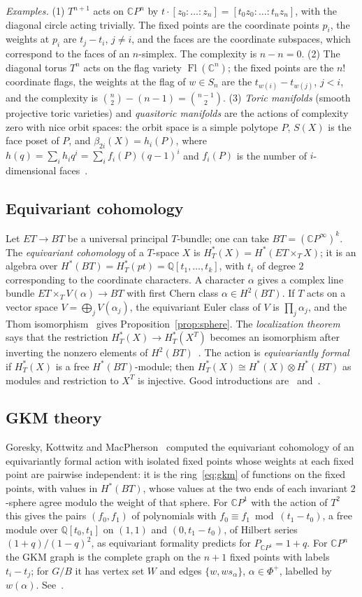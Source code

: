 \documentclass[11pt,a4paper]{article}
\numberwithin{equation}{section}
\theoremstyle{plain}
\theoremstyle{definition}
\theoremstyle{remark}
\newcommand{\Q}{\mathbb{Q}}
\newcommand{\C}{\mathbb{C}}
\newcommand{\HT}{H^{*}_{T}}
\DeclareMathOperator{\Fl}{Fl}
\begin{document}
\emph{Examples.} (1) $T^{n+1}$ acts on $\C P^n$ by $t\cdot[z_0:\dots:z_n]=[t_0z_0:\dots:t_nz_n]$, with the diagonal circle acting trivially. The fixed points are the coordinate points $p_i$, the weights at $p_i$ are $t_j-t_i$, $j\neq i$, and the faces are the coordinate subspaces, which correspond to the faces of an $n$-simplex. The complexity is $n-n=0$. (2) The diagonal torus $T^n$ acts on the flag variety $\Fl(\C^n)$; the fixed points are the $n!$ coordinate flags, the weights at the flag of $w\in S_n$ are the $t_{w(i)}-t_{w(j)}$, $j<i$, and the complexity is $\binom n2-(n-1)=\binom{n-1}2$. (3) \emph{Toric manifolds} (smooth projective toric varieties) and \emph{quasitoric manifolds} are the actions of complexity zero with nice orbit spaces: the orbit space is a simple polytope $P$, $S(X)$ is the face poset of $P$, and $\beta_{2i}(X)=h_i(P)$, where $h(q)=\sum_ih_iq^i=\sum_if_i(P)(q-1)^i$ and $f_i(P)$ is the number of $i$-dimensional faces~\cite{BP15}.

\subsection{Equivariant cohomology}\label{app:eqcoh}
Let $ET\to BT$ be a universal principal $T$-bundle; one can take $BT=(\C P^\infty)^k$. The \emph{equivariant cohomology} of a $T$-space $X$ is $\HT(X)=H^*(ET\times_TX)$; it is an algebra over $H^*(BT)=\HT(pt)=\Q[t_1,\dots,t_k]$, with $t_i$ of degree $2$ corresponding to the coordinate characters. A character $\alpha$ gives a complex line bundle $ET\times_TV(\alpha)\to BT$ with first Chern class $\alpha\in H^2(BT)$. If $T$ acts on a vector space $V=\bigoplus_jV(\alpha_j)$, the equivariant Euler class of $V$ is $\prod_j\alpha_j$, and the Thom isomorphism~\cite{MSt74} gives Proposition~\ref{prop:sphere}. The \emph{localization theorem} says that the restriction $\HT(X)\to\HT(X^T)$ becomes an isomorphism after inverting the nonzero elements of $H^2(BT)$~\cite{AtB84}. The action is \emph{equivariantly formal} if $\HT(X)$ is a free $H^*(BT)$-module; then $\HT(X)\cong H^*(X)\otimes H^*(BT)$ as modules and restriction to $X^T$ is injective. Good introductions are~\cite{Tym05} and~\cite{Bri98}.

\subsection{GKM theory}\label{app:gkm}
Goresky, Kottwitz and MacPherson~\cite{GKM98} computed the equivariant cohomology of an equivariantly formal action with isolated fixed points whose weights at each fixed point are pairwise independent: it is the ring~\eqref{eq:gkm} of functions on the fixed points, with values in $H^*(BT)$, whose values at the two ends of each invariant $2$-sphere agree modulo the weight of that sphere. For $\C P^1$ with the action of $T^2$ this gives the pairs $(f_0,f_1)$ of polynomials with $f_0\equiv f_1\bmod(t_1-t_0)$, a free module over $\Q[t_0,t_1]$ on $(1,1)$ and $(0,t_1-t_0)$, of Hilbert series $(1+q)/(1-q)^2$, as equivariant formality predicts for $P_{\C P^1}=1+q$. For $\C P^n$ the GKM graph is the complete graph on the $n+1$ fixed points with labels $t_i-t_j$; for $G/B$ it has vertex set $W$ and edges $\{w,ws_\alpha\}$, $\alpha\in\Phi^+$, labelled by $w(\alpha)$. See~\cite{Tym05}.
\end{document}
